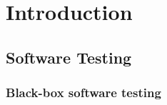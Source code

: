 \documentclass[
11pt, %
oneside, %
english, %
singlespacing, %
headsepline, %
]{MastersDoctoralThesis} %
\theoremstyle{plain}
\theoremstyle{definition}
\theoremstyle{remark}
\theoremstyle{remark}
\theoremstyle{plain}
\theoremstyle{plain}
\begin{document}




\mainmatter %

\pagestyle{thesis} %


%
% 
%
% 
% 

\chapter{Introduction}

\section{Software Testing}
\subsection{Black-box software testing}
\end{document}
